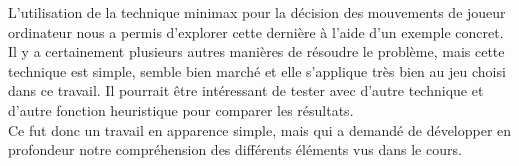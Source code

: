 \documentclass[12pt]{article}
\begin{document}
L’utilisation de la technique minimax pour la décision des mouvements de joueur ordinateur nous a permis d’explorer cette dernière à l’aide d’un exemple concret. Il y a certainement plusieurs autres manières de résoudre le problème, mais cette technique est simple, semble bien marché et elle s’applique très bien au jeu choisi dans ce travail. Il pourrait être intéressant de tester avec d’autre technique et d’autre fonction heuristique pour comparer les résultats.\\

Ce fut donc un travail en apparence simple, mais qui a demandé de développer en profondeur notre compréhension des différents éléments vus dans le cours. 
\end{document}
